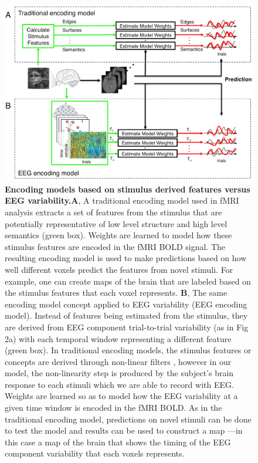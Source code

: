 \begin{figure}[ht!]
\centering
\includegraphics[width=.9\textwidth]{Fig1.png}
\caption{ \textbf{Encoding models based on stimulus derived features versus EEG variability.}\textbf{A}, A traditional encoding model used in fMRI analysis extracts a set of features from the stimulus that are potentially representative of low level structure and high level semantics (green box).  Weights are learned to model how these stimulus features are encoded in the fMRI BOLD signal.  The resulting encoding model is used to make predictions based on how well different voxels predict the features from novel stimuli.  For example, one can create maps of the brain that are labeled based on the stimulus features that each voxel represents. \textbf{B}, The same encoding model concept applied to EEG variability (EEG encoding model).  Instead of features being estimated from the stimulus, they are derived from EEG component trial-to-trial variability (as in Fig 2a) with each temporal window representing a different feature (green box). In traditional encoding models, the stimulus features or concepts are derived through non-linear filters \cite{Cukur2013,Hansen2007,Kay2008,Naselaris2011,Nishimoto2011,Stansbury2013}, however in our model, the non-linearity step is produced by the subject’s brain response to each stimuli which we are able to record with EEG. Weights are learned so as to model how the EEG variability at a given time window is encoded in the fMRI BOLD.  As in the traditional encoding model, predictions on novel stimuli can be done to test the model and results can be used to construct a map —in this case a map of the brain that shows the timing of the EEG component variability that each voxels represents.}
\label{fig:EncodingModel}
\end{figure}

